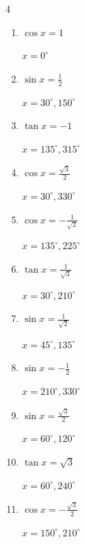 \begin{multicols}{4}
\begin{enumerate}
        $\displaystyle x = 150^{\circ} , 210^{\circ}$

  \item $\displaystyle \cos{x}  = 1$

        $\displaystyle x = 0^{\circ}$

  \item $\displaystyle \sin{x}  = \frac{1}{2}$

        $\displaystyle x = 30^{\circ} , 150^{\circ}$

  \item $\displaystyle \tan{x}  = -1$

        $\displaystyle x = 135^{\circ} , 315^{\circ}$

  \item $\displaystyle \cos{x}  = \frac{\sqrt{3}}{2}$

        $\displaystyle x = 30^{\circ} , 330^{\circ}$

  \item $\displaystyle \cos{x}  = -\frac{1}{\sqrt{2}}$

        $\displaystyle x = 135^{\circ} , 225^{\circ}$

  \item $\displaystyle \tan{x}  = \frac{1}{\sqrt{3}}$

        $\displaystyle x = 30^{\circ} , 210^{\circ}$

  \item $\displaystyle \sin{x}  = \frac{1}{\sqrt{2}}$

        $\displaystyle x = 45^{\circ} , 135^{\circ}$

  \item $\displaystyle \sin{x}  = -\frac{1}{2}$

        $\displaystyle x = 210^{\circ} , 330^{\circ}$

\columnbreak %

  \item $\displaystyle \sin{x}  = \frac{\sqrt{3}}{2}$

        $\displaystyle x = 60^{\circ} , 120^{\circ}$

  \item $\displaystyle \tan{x}  = \sqrt{3}$

        $\displaystyle x = 60^{\circ} , 240^{\circ}$

  \item $\displaystyle \cos{x}  = -\frac{\sqrt{3}}{2}$

        $\displaystyle x = 150^{\circ} , 210^{\circ}$


\end{enumerate}
\end{multicols}
